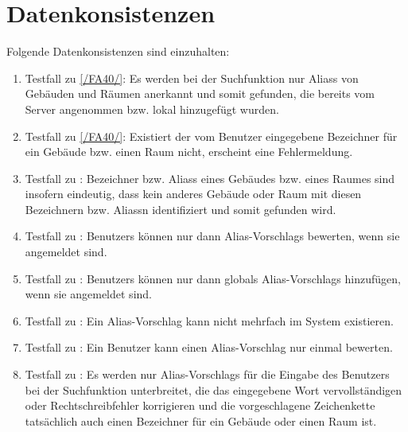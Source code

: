 \section{Datenkonsistenzen}

Folgende Datenkonsistenzen sind einzuhalten:
\begin{enumerate}[label=\textbf{/T\arabic*0/}, align=left, resume]
	\item \label{/T300/} Testfall zu \ref{/FA40/}: Es werden bei der Suchfunktion nur \Glspl{Alias} von Gebäuden und Räumen anerkannt und somit gefunden, die bereits vom \Gls{Server} angenommen bzw. \gls{lokal} hinzugefügt wurden.
	\item \label{/T310/} Testfall zu \ref{/FA40/}: Existiert der vom \Gls{Benutzer} eingegebene Bezeichner für ein Gebäude bzw. einen Raum nicht, erscheint eine Fehlermeldung.
	\item \label{/T320/} Testfall zu : Bezeichner bzw. \Glspl{Alias} eines Gebäudes bzw. eines Raumes sind insofern eindeutig, dass kein anderes Gebäude oder Raum mit diesen Bezeichnern bzw. \Glspl{Alias}n identifiziert und somit gefunden wird.
	\item \label{/T330/} Testfall zu : \Glspl{Benutzer} können nur dann \Glspl{Alias-Vorschlag} bewerten, wenn sie angemeldet sind.
	\item \label{/T340/} Testfall zu : \Glspl{Benutzer} können nur dann \glspl{global} \Glspl{Alias-Vorschlag} hinzufügen, wenn sie angemeldet sind.
	\item \label{/T350/} Testfall zu : Ein \Gls{Alias-Vorschlag} kann nicht mehrfach im System existieren.
	\item \label{/T360/} Testfall zu : Ein \Gls{Benutzer} kann einen \Gls{Alias-Vorschlag} nur einmal bewerten.
	\item \label{/T370/} Testfall zu : Es werden nur \Glspl{Alias-Vorschlag} für die Eingabe des \Gls{Benutzer}s bei der Suchfunktion unterbreitet, die das eingegebene Wort vervollständigen oder Rechtschreibfehler korrigieren und die vorgeschlagene Zeichenkette tatsächlich auch einen Bezeichner für ein Gebäude oder einen Raum ist.
\end{enumerate}